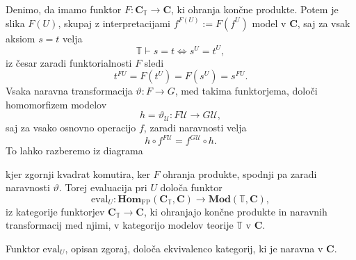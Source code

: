 \documentclass[../kategoricna_logika.tex]{subfiles}
\begin{document}
Denimo, da imamo funktor $F : \mathbf{C}_{\mathbb{T}} \to \mathbf{C}$,
ki ohranja končne produkte.
Potem je slika $F(U)$, skupaj z interpretacijami
$f^{F(U)} := F(f^U)$ model v $\mathbf{C}$, saj za
vsak aksiom $s = t$ velja
$$\mathbb{T} \vdash s = t  \iff  s^U = t^U,$$
%
iz česar zaradi funktorialnosti $F$ sledi
$$t^{FU} = F(t^U) = F(s^U) = s^{FU}.$$
%
Vsaka naravna transformacija $\vartheta : F \to G$, med takima
funktorjema, določi homomorfizem modelov
$$h = \vartheta_\mathcal{U} : F\mathcal{U} \to G\mathcal{U},$$
%
saj za vsako osnovno operacijo $f$, zaradi naravnosti velja
$$h \circ f^{F\mathcal{U}} = f^{G\mathcal{U}} \circ h.$$
To lahko razberemo iz diagrama
\begin{center}
\end{center}
kjer zgornji kvadrat komutira, ker $F$ ohranja produkte, spodnji
pa zaradi naravnosti $\vartheta$. Torej evaluacija pri $U$ določa funktor
\[ \mathrm{eval}_U : \mathbf{Hom}_{\mathrm{FP}}(\mathbf{C}_{\mathbb{T}}, \mathbf{C}) \to \mathbf{Mod}(\mathbb{T}, \mathbf{C}), \]
iz kategorije funktorjev $\mathbf{C}_{\mathbb{T}} \to \mathbf{C}$,
ki ohranjajo končne produkte in naravnih transformacij med njimi,
v kategorijo modelov teorije $\mathbb{T}$ v $\mathbf{C}$.
\begin{trditev}\label{trditev:modeli-so-funktorji}
  Funktor $\mathrm{eval}_U$, opisan zgoraj, določa ekvivalenco kategorij,
  ki je naravna v $\mathbf{C}$.
\end{trditev}
\end{document}
